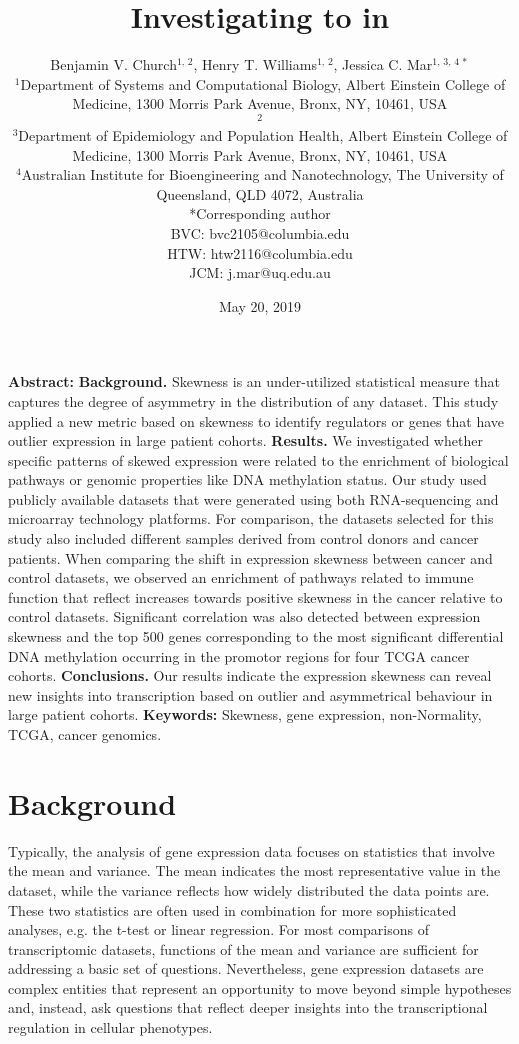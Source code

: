 \documentclass[11pt]{article}
\title{Investigating \sr{Skewness} \rd{skewness} to \sr{Understand} \rd{understand} \sr{Gene} \rd{gene} \sr{Expression} \rd{expression} \sr{Heterogeneity} \rd{heterogeneity} in \sr{Large} \rd{large} \sr{Patient} \rd{patient} \sr{Cohorts} \rd{cohorts.} 
\newline}
\date{May 20, 2019}
\author{%
Benjamin V. Church$^{1, \, 2}$, Henry T. Williams$^{1, \,2}$, Jessica C. Mar$^{1, \,3, \, 4 \, *}$
\newline
\\
$^{1}$Department of Systems and Computational Biology, Albert Einstein College of Medicine, 1300 Morris Park Avenue, Bronx, NY, 10461, USA
\\
$^{2}$\rd{Department of Mathematics, Columbia University, 2990 Broadway, NY 10027, USA.}
\\
$^{3}$Department of Epidemiology and Population Health, Albert Einstein College of Medicine, 1300 Morris Park Avenue, Bronx, NY, 10461, USA
\\
$^{4}$Australian Institute for Bioengineering and Nanotechnology, The University of Queensland, QLD 4072, Australia
\newline
\\
*Corresponding author
\\
BVC: bvc2105@columbia.edu
\\
HTW: htw2116@columbia.edu
\\
JCM: j.mar@uq.edu.au
}
\makeatletter
\newcommand{\rd}[1]{{\color{red}#1}}
\renewcommand{\maketitle}{\bgroup\setlength{\parindent}{0pt}
\begin{flushleft}
  \textbf{\@title}

  \@author
\end{flushleft}\egroup
}
\makeatother
\begin{document}
\maketitle
\thispagestyle{empty} %
\newpage

\noindent
\textbf{Abstract:} 
\newline
\newline
\rd{\bf{Background.}} Skewness is an under-utilized statistical measure that captures the degree of asymmetry in the distribution of any dataset. This study applied a new metric based on skewness to identify regulators or genes that have outlier expression in large patient cohorts. 
\bigskip\newline
\rd{\bf{Results.}} We investigated whether specific patterns of skewed expression were related to the enrichment of biological pathways or genomic properties like DNA methylation status. Our study used publicly available datasets that were generated using both RNA-sequencing and microarray technology platforms. For comparison, the datasets selected for this study also included different samples derived from control donors and cancer patients. When comparing the shift in expression skewness between cancer and control datasets, we observed an enrichment of pathways related to immune function that reflect increases towards positive skewness in the cancer relative to control datasets. Significant correlation was also detected between expression skewness and the top 500 genes corresponding to the most significant differential DNA methylation occurring in the promotor regions for four TCGA cancer cohorts. 
\bigskip\newline
\rd{\bf{Conclusions.}} Our results indicate the expression skewness can reveal new insights into transcription based on outlier and asymmetrical behaviour in large patient cohorts. 
\newline
\newline
\textbf{Keywords:} Skewness, gene expression, non-Normality, TCGA, cancer genomics.

\section*{Background}

Typically, the analysis of gene expression data focuses on statistics that involve the mean and variance. The mean indicates the most representative value in the dataset, while the variance reflects how widely distributed the data points are. These two statistics are often used in combination for more sophisticated analyses, e.g. the t-test or linear regression. For most comparisons of transcriptomic datasets, functions of the mean and variance are sufficient for addressing a basic set of questions. Nevertheless, gene expression datasets are complex entities that represent an opportunity to move beyond simple hypotheses and, instead, ask questions that reflect deeper insights into the transcriptional regulation in cellular phenotypes. 
\newline
\end{document}
